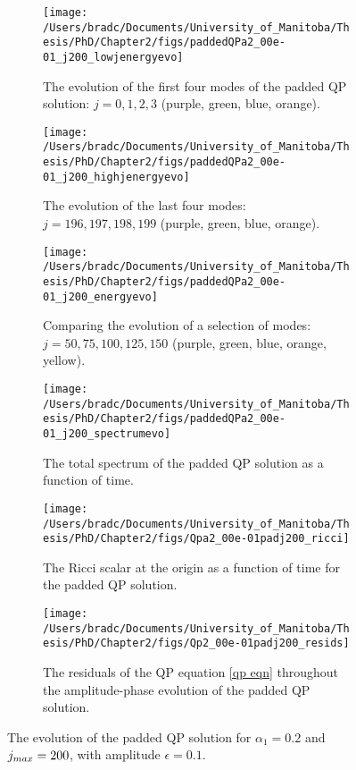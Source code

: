 \documentclass[../PhD.tex]{subfiles}
\begin{document}
\begin{figure}[h]
	\centering
	\begin{subfigure}[t]{0.45\textwidth}
		\texttt{[image: /Users/bradc/Documents/University\_of\_Manitoba/Thesis/PhD/Chapter2/figs/paddedQPa2\_00e-01\_j200\_lowjenergyevo]}
		\caption{The evolution of the first four modes of the padded QP solution: $j=0,1,2,3$ (purple, green, blue, orange).}
	\end{subfigure}
	\;
	\begin{subfigure}[t]{0.45\textwidth}
		\texttt{[image: /Users/bradc/Documents/University\_of\_Manitoba/Thesis/PhD/Chapter2/figs/paddedQPa2\_00e-01\_j200\_highjenergyevo]}
		\caption{The evolution of the last four modes: $j = 196, 197, 198, 199$ (purple, green, blue, orange).}
	\end{subfigure}
	\;
	\begin{subfigure}[t]{0.45\textwidth}
		\texttt{[image: /Users/bradc/Documents/University\_of\_Manitoba/Thesis/PhD/Chapter2/figs/paddedQPa2\_00e-01\_j200\_energyevo]}
		\caption{Comparing the evolution of a selection of modes: $j= 50, 75, 100, 125, 150$ (purple, green, blue, orange, yellow).}
	\end{subfigure}
	\;
	\begin{subfigure}[t]{0.45\textwidth}
		\texttt{[image: /Users/bradc/Documents/University\_of\_Manitoba/Thesis/PhD/Chapter2/figs/paddedQPa2\_00e-01\_j200\_spectrumevo]}
		\caption{The total spectrum of the padded QP solution as a function of time.}
		\label{fig: paddedqp_fullspecevo}
	\end{subfigure}
	\;
	\begin{subfigure}[t]{0.45\textwidth}
		\texttt{[image: /Users/bradc/Documents/University\_of\_Manitoba/Thesis/PhD/Chapter2/figs/Qpa2\_00e-01padj200\_ricci]}
		\caption{The Ricci scalar at the origin as a function of time for the padded QP solution.}
	\end{subfigure}
	\;
	\begin{subfigure}[t]{0.45\textwidth}
		\texttt{[image: /Users/bradc/Documents/University\_of\_Manitoba/Thesis/PhD/Chapter2/figs/Qp2\_00e-01padj200\_resids]}
		\caption{The residuals of the QP equation \eqref{qp eqn} throughout the amplitude-phase evolution of the padded QP solution.}
		\label{fig: Qp2_00e-01padj200_resids}
	\end{subfigure}
	\caption[The evolution of a padded QP solution]{The evolution of the padded QP solution for $\alpha_1 =0.2$ and $j_{max} = 200$, with amplitude $\epsilon=0.1$.}
	\label{fig:paddedqpevo}
\end{figure}
\end{document}
